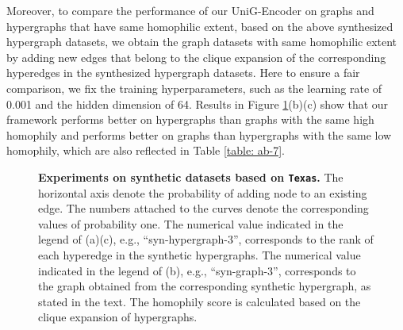 \documentclass[review]{elsarticle}
\begin{document}
\begin{table}[htbp]
  \centering
  \caption{\textbf{Corresponding homophily scores for different probabilities of adding node to an existing edge and different ranks of synthetic hypergraphs.}}
  \label{table: ab-6}
\end{table}

Moreover, to compare the performance of our UniG-Encoder on graphs and hypergraphs that have same homophilic extent, based on the above synthesized hypergraph datasets, we obtain the graph datasets with same homophilic extent by adding new edges that belong to the clique expansion of the corresponding hyperedges in the synthesized hypergraph datasets. Here to ensure a fair comparison, we fix the training hyperparameters, such as the learning rate of 0.001 and the hidden dimension of 64. Results in Figure \ref{fig:q5-5}(b)(c) show that our framework performs better on hypergraphs than graphs with the same high homophily and performs better on graphs than hypergraphs with the same low homophily, which are also reflected in Table \ref{table: ab-7}.

\begin{figure}[htbp]
  \centering
  \caption{\textbf{Experiments on synthetic datasets based on \texttt{Texas}.} The horizontal axis denote the probability of adding node to an existing edge. The numbers attached to the curves denote the corresponding values of probability one. The numerical value indicated in the legend of (a)(c), e.g., ``syn-hypergraph-3'', corresponds to the rank of each hyperedge in the synthetic hypergraphs. The numerical value indicated in the legend of (b), e.g., ``syn-graph-3'', corresponds to the graph obtained from the corresponding synthetic hypergraph, as stated in the text. The homophily score is calculated based on the clique expansion of hypergraphs.}
  \label{fig:q5-5}
\end{figure}
\end{document}
